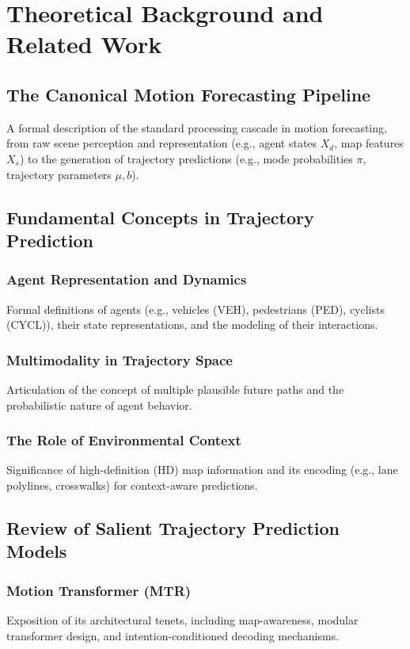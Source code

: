 \chapter{Theoretical Background and Related Work}
\label{ch:background_main}

\section{The Canonical Motion Forecasting Pipeline}
\label{sec:bg_pipeline_main}
A formal description of the standard processing cascade in motion forecasting, from raw scene perception and representation (e.g., agent states $X_d$, map features $X_s$) to the generation of trajectory predictions (e.g., mode probabilities $\pi$, trajectory parameters $\mu, b$).

\section{Fundamental Concepts in Trajectory Prediction}
\label{sec:bg_concepts_main}
    \subsection{Agent Representation and Dynamics}
    Formal definitions of agents (e.g., vehicles (VEH), pedestrians (PED), cyclists (CYCL)), their state representations, and the modeling of their interactions.
    \subsection{Multimodality in Trajectory Space}
    Articulation of the concept of multiple plausible future paths and the probabilistic nature of agent behavior.
    \subsection{The Role of Environmental Context}
    Significance of high-definition (HD) map information and its encoding (e.g., lane polylines, crosswalks) for context-aware predictions.

\section{Review of Salient Trajectory Prediction Models}
\label{sec:bg_models_main}
    \subsection{Motion Transformer (MTR)}
    Exposition of its architectural tenets, including map-awareness, modular transformer design, and intention-conditioned decoding mechanisms.
